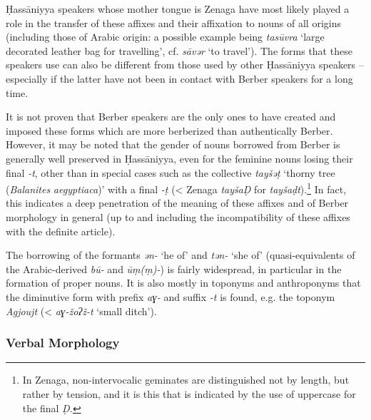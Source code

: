 \documentclass[output=paper]{langsci/langscibook}
\begin{document}
Ḥassāniyya speakers whose mother tongue is Zenaga have most likely played a role in the transfer of these affixes and their affixation to nouns of all origins (including those of Arabic origin: a possible example being \textit{tasūvra} ‘large decorated leather bag for travelling’, cf. \textit{sāvər} ‘to travel’). The forms that these speakers use can also be different from those used by other Ḥassāniyya speakers – especially if the latter have not been in contact with Berber speakers for a long time. 

It is not proven that Berber speakers are the only ones to have created and imposed these forms which are more berberized than authentically Berber. However, it may be noted that the gender of nouns borrowed from Berber is generally well preserved in Ḥassāniyya, even for the feminine nouns losing their final \textit{{}-t}, other than in special cases such as the collective \textit{tayšəṭ} ‘thorny tree (\textit{Balanites} \textit{aegyptiaca})’ with a final \textit{{}-ṭ} (< Zenaga \textit{tayšaḌ} for \textit{tayšaḍt}).\footnote{In Zenaga, non-intervocalic geminates are distinguished not by length, but rather by tension, and it is this that is indicated by the use of uppercase for the final \textit{Ḍ.} } In fact, this indicates a deep penetration of the meaning of these affixes and of Berber morphology in general (up to and including the incompatibility of these affixes with the definite article). 

The borrowing of the formants \textit{ən-} ‘he of’ and \textit{tən-} ‘she of’ (quasi-equivalents of the Arabic-derived \textit{bū-} and \textit{ūṃ(ṃ)-}) is fairly widespread, in particular in the formation of proper nouns. It is also mostly in toponyms and anthroponyms that the diminutive form with prefix \textit{aɣ-} and suffix \textit{{}-t} is found, e.g. the toponym \textit{Agjoujt} (< \textit{aɣ-žoʔž-t} ‘small ditch’).

\subsubsection{Verbal Morphology} %

\label{sa}
\end{document}
